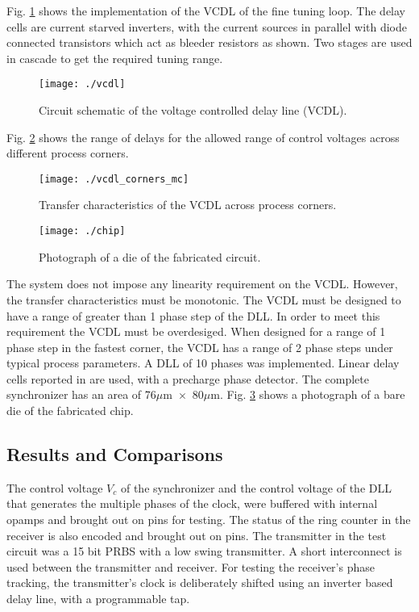 \documentclass[journal,twoside,letterpaper]{IEEEtran}
\begin{document}
Fig. \ref{fig:vcdl} shows the implementation of the VCDL
of the fine tuning loop. The delay cells are current starved inverters,
with the current sources in parallel with diode connected transistors which
act as bleeder resistors as shown. Two stages are used in cascade to get the
required tuning range. 
\begin{figure}[h!]
\centering
\texttt{[image: ./vcdl]}
\caption{Circuit schematic of the voltage controlled delay line (VCDL).}
\label{fig:vcdl}
\end{figure}
Fig. \ref{fig:vcdl_range} shows the range of delays for the allowed
range of control voltages across different process corners.
\begin{figure}[h!]
\centering
{}
\texttt{[image: ./vcdl\_corners\_mc]}
\caption{Transfer characteristics of the VCDL across process corners.}
\label{fig:vcdl_range}
\end{figure}
\begin{figure}[h]
\centering
{}
\texttt{[image: ./chip]}
\caption{Photograph of a die of the fabricated circuit.}
\label{fig:chip}
\end{figure}
The system does not impose any linearity requirement on the VCDL. However,
the transfer characteristics must be monotonic. The VCDL must be designed 
to have a range of greater than 1 phase step of the DLL.
In order to meet this requirement the VCDL must be overdesiged. 
When designed for a range of 1 phase step in the fastest corner,
the VCDL has a range of 2 phase steps under typical process parameters.
A DLL of 10 phases was implemented. Linear delay cells
reported in \cite{delay_cell_2008} are used, with a precharge phase 
detector. The complete synchronizer has an area of 
\mbox{76$\mu$m $\times$ 80$\mu$m}. 
Fig. \ref{fig:chip} shows a photograph of
a bare die of the fabricated chip.

\subsection{Results and Comparisons}
The control voltage $V_c$ of the synchronizer and the
control voltage of the DLL that generates the multiple phases of the clock,
were buffered with internal opamps and brought out on pins for
testing. The status of the ring counter in the receiver is
also encoded and brought out on pins. The transmitter in the
test circuit was a 15 bit PRBS with a low swing transmitter.
A short interconnect is used between the transmitter and receiver. For
testing the receiver's phase tracking, the transmitter's clock 
is deliberately shifted using an
inverter based delay line, with a programmable tap.
\end{document}
